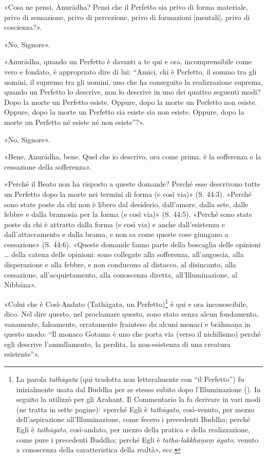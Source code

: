 «Cosa ne pensi, Anurādha? Pensi che il Perfetto sia privo di forma
materiale, privo di sensazione, privo di percezione, privo di formazioni
[mentali], privo di coscienza?».


«No, Signore».


«Anurādha, quando un Perfetto è davanti a te qui e ora, incomprensibile
come vero e fondato, è appropriato dire di lui: “Amici, chi è Perfetto,
il sommo tra gli uomini, il supremo tra gli uomini, uno che ha
conseguito la realizzazione suprema, quando un Perfetto lo descrive, non
lo descrive in uno dei quattro seguenti modi? Dopo la morte un Perfetto
esiste. Oppure, dopo la morte un Perfetto non esiste. Oppure, dopo la
morte un Perfetto sia esiste sia non esiste. Oppure, dopo la morte un
Perfetto né esiste né non esiste”?».


«No, Signore».


«Bene, Anurādha, bene. Quel che io descrivo, ora come prima, è la
sofferenza e la cessazione della sofferenza».




«Perché il Beato non ha risposto a queste domande? Perché esse
descrivono tutte un Perfetto dopo la morte nei termini di forma (e così
via)» (S. 44:3). «Perché sono state poste da chi non è libero dal
desiderio, dall’amore, dalla sete, dalle febbre e dalla bramosia per la
forma (e così via)» (S. 44:5). «Perché sono state poste da chi è
attratto dalla forma (e così via) e anche dall’esistenza e
dall’attaccamento e dalla brama, e non sa come queste cose giungano a
cessazione» (S. 44:6). «Queste domande fanno parte della boscaglia delle
opinioni … della catena delle opinioni: sono collegate alla sofferenza,
all’angoscia, alla disperazione e alla febbre, e non conducono al
distacco, al disincanto, alla cessazione, all’acquietamento, alla
conoscenza diretta, all’Illuminazione, al Nibbāna».




\label{pag226}«Colui che è Così-Andato (Tathāgata, un Perfetto)\footnote{La parola \emph{tathāgata} (qui tradotta non letteralmente con “il Perfetto”) fu inizialmente usata dal Buddha per se stesso subito dopo l’Illuminazione (\hyperlink{cap-03-Dopo-l-Illuminazione#pag41}{}). In seguito la utilizzò per gli Arahant. Il Commentario la fa derivare in vari modi (ne tratta in sette pagine): «perché Egli è \emph{tathāgato}, così-venuto, per mezzo dell’aspirazione all’Illuminazione, come fecero i precedenti Buddha; perché Egli è \emph{tathāgato}, così-andato, per mezzo della pratica e della realizzazione, come pure i precedenti Buddha; perché Egli è \emph{tatha-lakkhaṇaṃ āgato}, venuto a conoscenza della caratteristica della realtà», ecc.} è qui
e ora inconoscibile, dico. Nel dire questo, nel proclamare questo, sono
stato senza alcun fondamento, vanamente, falsamente, erratamente
frainteso da alcuni monaci e brāhmaṇa in questo modo: “Il monaco Gotama
è uno che porta via (verso il nichilismo) perché egli descrive
l’annullamento, la perdita, la non-esistenza di una creatura
esistente”».


